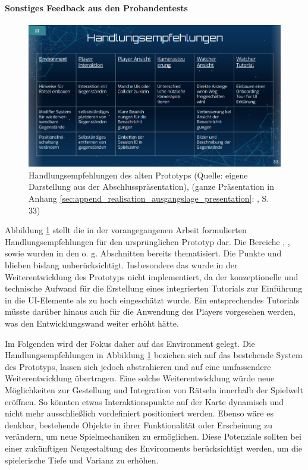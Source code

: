 \paragraph{Sonstiges Feedback aus den Probandentests}
\begin{figure}[ht]
\centering
\includegraphics[width=1\linewidth]{content/pictures/Handlungsempfehlungen.PNG}
\caption{Handlungsempfehlungen des alten Prototyps (Quelle: eigene Darstellung aus der Abschlusspräsentation), (ganze Präsentation in Anhang \ref{sec:append_realisation_ausgangslage_presentation}: , S. 33)}
\label{fig:recommended-action}
\end{figure}

Abbildung \ref{fig:recommended-action} stellt die in der vorangegangenen Arbeit formulierten Handlungsempfehlungen für den ursprünglichen Prototyp dar. Die Bereiche , ,  sowie  wurden in den o. g. Abschnitten bereits thematisiert. Die Punkte  und  blieben bislang unberücksichtigt. Insbesondere das  wurde in der Weiterentwicklung des Prototyps nicht implementiert, da der konzeptionelle und technische Aufwand für die Erstellung eines integrierten Tutorials zur Einführung in die \ac{UI}-Elemente als zu hoch eingeschätzt wurde. Ein entsprechendes Tutorials müsste darüber hinaus auch für die Anwendung des Players vorgesehen werden, was den Entwicklungswand weiter erhöht hätte.

Im Folgenden wird der Fokus daher auf das Environment gelegt. Die Handlungsempfehlungen in Abbildung \ref{fig:recommended-action} beziehen sich auf das bestehende System des Prototyps, lassen sich jedoch abstrahieren und auf eine umfassendere Weiterentwicklung übertragen. Eine solche Weiterentwicklung würde neue Möglichkeiten zur Gestellung und Integration von Rätseln innerhalb der Spielwelt eröffnen. So könnten etwas Interaktionspunkte auf der Karte dynamisch und nicht mehr ausschließlich vordefiniert positioniert werden. Ebenso wäre es denkbar, bestehende Objekte in ihrer Funktionalität oder Erscheinung zu verändern, um neue Spielmechaniken zu ermöglichen. Diese Potenziale sollten bei einer zukünftigen Neugestaltung des Environments berücksichtigt werden, um die spielerische Tiefe und Varianz zu erhöhen.

